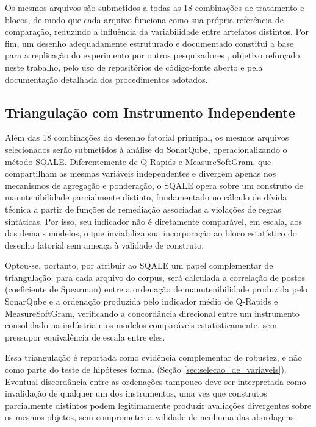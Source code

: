 Os mesmos arquivos são submetidos a todas as 18 combinações de tratamento e blocos, de modo que cada arquivo funciona como sua própria referência de comparação, reduzindo a influência da variabilidade entre artefatos distintos. Por fim, um desenho adequadamente estruturado e documentado constitui a base para a replicação do experimento por outros pesquisadores , objetivo reforçado, neste trabalho, pelo uso de repositórios de código-fonte aberto e pela documentação detalhada dos procedimentos adotados.

\subsection{Triangulação com Instrumento Independente}
\label{sec:triangulacao_sqale}

Além das 18 combinações do desenho fatorial principal, os mesmos arquivos selecionados serão submetidos à análise do SonarQube, operacionalizando o método SQALE. Diferentemente de Q-Rapids e MeasureSoftGram, que compartilham as mesmas variáveis independentes e divergem apenas nos mecanismos de agregação e ponderação, o SQALE opera sobre um construto de manutenibilidade parcialmente distinto, fundamentado no cálculo de dívida técnica a partir de funções de remediação associadas a violações de regras sintáticas. Por isso, seu indicador não é diretamente comparável, em escala, aos dos demais modelos, o que inviabiliza sua incorporação ao bloco estatístico do desenho fatorial sem ameaça à validade de construto.

Optou-se, portanto, por atribuir ao SQALE um papel complementar de triangulação: para cada arquivo do corpus, será calculada a correlação de postos (coeficiente de Spearman) entre a ordenação de manutenibilidade produzida pelo SonarQube e a ordenação produzida pelo indicador médio de Q-Rapids e MeasureSoftGram, verificando a concordância direcional entre um instrumento consolidado na indústria e os modelos comparáveis estatisticamente, sem pressupor equivalência de escala entre eles.

Essa triangulação é reportada como evidência complementar de robustez, e não como parte do teste de hipóteses formal (Seção \ref{sec:selecao_de_variaveis}). Eventual discordância entre as ordenações tampouco deve ser interpretada como invalidação de qualquer um dos instrumentos, uma vez que construtos parcialmente distintos podem legitimamente produzir avaliações divergentes sobre os mesmos objetos, sem comprometer a validade de nenhuma das abordagens.

